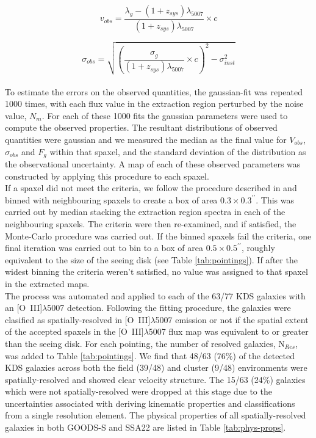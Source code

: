 \documentclass[fleqn,usenatbib]{mnras}
\begin{document}
\begin{equation}\label{eq:velocity_comp}
   v_{obs} = \frac{\lambda_{g} - (1 + z_{sys})\lambda_{5007}}{(1 + z_{sys})\lambda_{5007}} \times c
\end{equation}

\begin{equation}\label{eq:dispersion_comp}
   \sigma_{obs} = \sqrt{\left(\frac{\sigma_{g}}{(1 + z_{sys})\lambda_{5007}} \times c\right)^{2} - \sigma_{inst}^{2}}
\end{equation} \\



To estimate the errors on the observed quantities, the gaussian-fit was repeated 1000 times, with each flux value in the extraction region perturbed by the noise value, $N_{m}$.
For each of these 1000 fits the gaussian parameters were used to compute the observed properties.
The resultant distributions of observed quantities were gaussian and we measured the median as the final value for $V_{obs}$, $\sigma_{obs}$ and $F_{g}$ within that spaxel, and the standard deviation of the distribution as the observational uncertainty.
A map of each of these observed parameters was constructed by applying this procedure to each spaxel. \\


If a spaxel did not meet the criteria, we follow the procedure described in \cite{Stott2016} and binned with neighbouring spaxels to create a box of area $0.3\times0.3^{\prime\prime}$.
This was carried out by median stacking the extraction region spectra in each of the neighbouring spaxels.
The criteria were then re-examined, and if satisfied, the Monte-Carlo procedure was carried out. 
If the binned spaxels fail the criteria, one final iteration was carried out to bin to a box of area $0.5\times0.5^{\prime\prime}$, roughly equivalent to the size of the seeing disk (see Table \ref{tab:pointings}).
If after the widest binning the criteria weren't satisfied, no value was assigned to that spaxel in the extracted maps. \\


The process was automated and applied to each of the 63/77 KDS galaxies with an [O~{\sc III}]$\lambda$5007 detection.
Following the fitting procedure, the galaxies were clasified as spatially-resolved in [O~{\sc III}]$\lambda$5007 emission or not if the spatial extent of the accepted spaxels in the [O~{\sc III}]$\lambda$5007 flux map was equivalent to or greater than the seeing disk.
For each pointing, the number of resolved galaxies, N$_{Res}$, was added to Table \ref{tab:pointings}.
We find that 48/63 (76\%) of the detected KDS galaxies across both the field (39/48) and cluster (9/48) environments were spatially-resolved and showed clear velocity structure.
The 15/63 (24\%) galaxies which were not spatially-resolved were dropped at this stage due to the uncertainties associated with deriving kinematic properties and classifications from a single resolution element.
The physical properties of all spatially-resolved galaxies in both GOODS-S and SSA22 are listed in Table \ref{tab:phys-props}. \\ 
\end{document}
